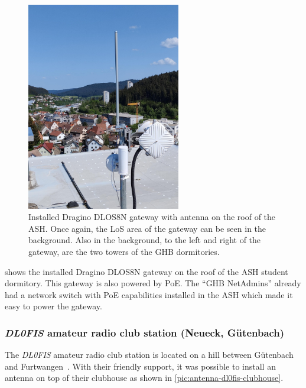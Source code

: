 \begin{figure}[htbp]
    \centering
    \includegraphics[width=0.6\textwidth]{pictures/hardware/gateway-deployment/gateway_ash.jpg}
    \caption{
        Installed Dragino DLOS8N gateway with antenna on the roof of the \ac{ASH}.
        Once again, the \ac{LoS} area of the gateway can be seen in the background.
        Also in the background, to the left and right of the gateway, are the two towers of the \ac{GHB} dormitories.
    }\label{pic:dragino-gateway-ash}
\end{figure}

 shows the installed Dragino DLOS8N gateway on the roof of the \ac{ASH} student dormitory.
This gateway is also powered by \ac{PoE}.
The ``\ac{GHB} NetAdmins'' already had a network switch with \ac{PoE} capabilities installed in the \ac{ASH} which made it easy to power the gateway.

\subsubsection{\emph{DL0FIS} amateur radio club station (Neueck, Gütenbach)}

The \emph{DL0FIS} amateur radio club station is located on a hill between Gütenbach and Furtwangen~\cite{dl0fis_clubstation_2023}.
With their friendly support, it was possible to install an antenna on top of their clubhouse as shown in \cref{pic:antenna-dl0fis-clubhouse}.

